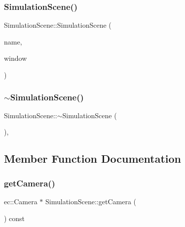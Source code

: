 \subsubsection{\texorpdfstring{Simulation\+Scene()}{SimulationScene()}}
{\footnotesize\ttfamily Simulation\+Scene\+::\+Simulation\+Scene (\begin{DoxyParamCaption}\item[{const std\+::string \&}]{name,  }\item[{\mbox{\hyperlink{class_simulation_window}{Simulation\+Window}} $\ast$}]{window }\end{DoxyParamCaption})\hspace{0.3cm}{\ttfamily [explicit]}}

\mbox{\label{class_simulation_scene_ab084c186d269ce4576b2dda25fc0fbd6}} 
\subsubsection{\texorpdfstring{$\sim$\+Simulation\+Scene()}{~SimulationScene()}}
{\footnotesize\ttfamily Simulation\+Scene\+::$\sim$\+Simulation\+Scene (\begin{DoxyParamCaption}{ }\end{DoxyParamCaption})\hspace{0.3cm}{\ttfamily [virtual]}, {\ttfamily [default]}}



\subsection{Member Function Documentation}
\mbox{\label{class_simulation_scene_a755153bde36d77afa9ad69a300463c31}} 
\subsubsection{\texorpdfstring{get\+Camera()}{getCamera()}}
{\footnotesize\ttfamily ec\+::\+Camera $\ast$ Simulation\+Scene\+::get\+Camera (\begin{DoxyParamCaption}{ }\end{DoxyParamCaption}) const}

